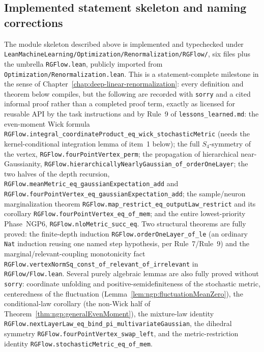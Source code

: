 \subsection{Implemented statement skeleton and naming corrections}

The module skeleton described above is implemented and typechecked under
\texttt{LeanMachineLearning/Optimization/Renormalization/RGFlow/}, six files plus the umbrella
\texttt{RGFlow.lean}, publicly imported from \texttt{Optimization/Renormalization.lean}. This is a
statement-complete milestone in the sense of Chapter~\ref{chap:deep-linear-renormalization}: every
definition and theorem below compiles, but the following are recorded with \texttt{sorry} and a
cited informal proof rather than a completed proof term, exactly as licensed for reusable API by
the task instructions and by Rule~9 of \texttt{lessons\_learned.md}: the even-moment Wick formula
\texttt{RGFlow.integral\_coordinateProduct\_eq\_wick\_stochasticMetric} (needs the kernel-conditional
integration lemma of item~1 below); the full $S_4$-symmetry of the vertex,
\texttt{RGFlow.fourPointVertex\_perm}; the propagation of hierarchical near-Gaussianity,
\texttt{RGFlow.hierarchicallyNearlyGaussian\_of\_orderOneLayer}; the two halves of the depth
recursion, \texttt{RGFlow.meanMetric\_eq\_gaussianExpectation\_add} and
\texttt{RGFlow.fourPointVertex\_eq\_gaussianExpectation\_add}; the sample/neuron marginalization
theorem \texttt{RGFlow.map\_restrict\_eq\_outputLaw\_restrict} and its corollary
\texttt{RGFlow.fourPointVertex\_eq\_of\_mem}; and the entire lowest-priority Phase~NGP6,
\texttt{RGFlow.nloMetric\_succ\_eq}. Two structural theorems are fully proved: the finite-depth
induction \texttt{RGFlow.orderOneLayer\_of\_le} (an ordinary \texttt{Nat} induction reusing one
named step hypothesis, per Rule~7/Rule~9) and the marginal/relevant-coupling monotonicity fact
\texttt{RGFlow.vertexNormSq\_const\_of\_relevant\_of\_irrelevant} in \texttt{RGFlow/Flow.lean}.
Several purely algebraic lemmas are also fully proved without \texttt{sorry}: coordinate unfolding
and positive-semidefiniteness of the stochastic metric, centeredness of the fluctuation
(Lemma~\ref{lem:ngp:fluctuationMeanZero}), the conditional-law corollary
(the non-Wick half of Theorem~\ref{thm:ngp:generalEvenMoment}), the mixture-law identity
\texttt{RGFlow.nextLayerLaw\_eq\_bind\_pi\_multivariateGaussian}, the dihedral symmetry
\texttt{RGFlow.fourPointVertex\_swap\_left}, and the metric-restriction identity
\texttt{RGFlow.stochasticMetric\_eq\_of\_mem}.

